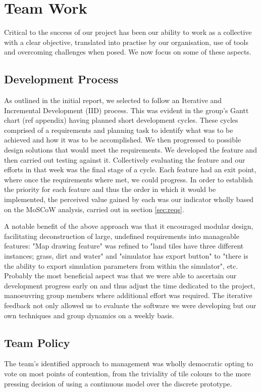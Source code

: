 \section{Team Work}
Critical to the success of our project has been our ability to work as a collective with a clear objective, translated into practise by our organisation, use of tools and overcoming challenges when posed. We now focus on some of these aspects.

\subsection{Development Process}
As outlined in the initial report, we selected to follow an Iterative and Incremental Development (IID) process. This was evident in the group's Gantt chart (ref appendix) having planned short development cycles. These cycles comprised of a requirements and planning task to identify what was to be achieved and how it was to be accomplished. We then progressed to possible design solutions that would meet the requirements. We developed the feature and then carried out testing against it. Collectively evaluating the feature and our efforts in that week was the final stage of a cycle. Each feature had an exit point, where once the requirements where met, we could progress. In order to establish the priority for each feature and thus the order in which it would be implemented, the perceived value gained by each was our indicator wholly based on the MoSCoW analysis, carried out in section \ref{sec:reqs}.

A notable benefit of the above approach was that it encouraged modular design, facilitating deconstruction of large, undefined requirements into manageable features: "Map drawing feature" was refined to "land tiles have three different instances; grass, dirt and water" and "simulator has export button" to "there is the ability to export simulation parameters from within the simulator", etc.  
Probably the most beneficial aspect was that we were able to ascertain our development progress early on and thus adjust the time dedicated to the project, manoeuvring group members where additional effort was required. The iterative feedback not only allowed us to evaluate the software we were developing but our own techniques and group dynamics on a weekly basis.

\subsection{Team Policy}
The team's identified approach to management was wholly democratic opting to vote on most points of contention, from the triviality of tile colours to the more pressing decision of using a continuous model over the discrete prototype.


